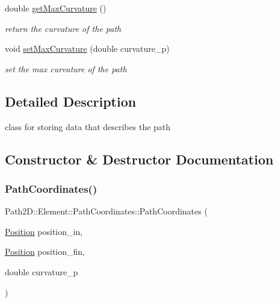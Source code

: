 \begin{DoxyCompactItemize}
double \mbox{\hyperlink{class_path2_d_1_1_element_1_1_path_coordinates_a0af78108850ec2152b187cb18f48cb2b}{get\+Max\+Curvature}} ()
\begin{DoxyCompactList}\small\item\em return the curvature of the path \end{DoxyCompactList}\item 
void \mbox{\hyperlink{class_path2_d_1_1_element_1_1_path_coordinates_a35528f5a799aadeaf6b1c5b04459af5b}{set\+Max\+Curvature}} (double curvature\+\_\+p)
\begin{DoxyCompactList}\small\item\em set the max curvature of the path \end{DoxyCompactList}\end{DoxyCompactItemize}


\subsection{Detailed Description}
class for storing data that describes the path 

\subsection{Constructor \& Destructor Documentation}
\mbox{\label{class_path2_d_1_1_element_1_1_path_coordinates_a63f9e5d25a023ed5aa42d440ef095afa}} 
\subsubsection{\texorpdfstring{Path\+Coordinates()}{PathCoordinates()}}
{\footnotesize\ttfamily Path2\+D\+::\+Element\+::\+Path\+Coordinates\+::\+Path\+Coordinates (\begin{DoxyParamCaption}\item[{\mbox{\hyperlink{class_path2_d_1_1_element_1_1_position}{Position}}}]{position\+\_\+in,  }\item[{\mbox{\hyperlink{class_path2_d_1_1_element_1_1_position}{Position}}}]{position\+\_\+fin,  }\item[{double}]{curvature\+\_\+p }\end{DoxyParamCaption})}



